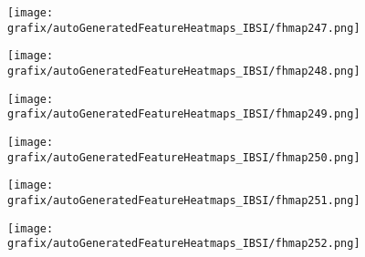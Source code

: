 \hspace{\hsp} 
\begin{subfigure}{\wid\textwidth} 
    \centering 
    \caption{\tiny \sffamily {}} 
    \vspace{\vsp} 
    \texttt{[image: grafix/autoGeneratedFeatureHeatmaps\_IBSI/fhmap247.png]} 
\end{subfigure} 
\hspace{\hsp} 
\begin{subfigure}{\wid\textwidth} 
    \centering 
    \caption{\tiny \sffamily {}} 
    \vspace{\vsp} 
    \texttt{[image: grafix/autoGeneratedFeatureHeatmaps\_IBSI/fhmap248.png]} 
\end{subfigure} 
\hspace{\hsp} 
\begin{subfigure}{\wid\textwidth} 
    \centering 
    \caption{\tiny \sffamily {}} 
    \vspace{\vsp} 
    \texttt{[image: grafix/autoGeneratedFeatureHeatmaps\_IBSI/fhmap249.png]} 
\end{subfigure} 
\hspace{\hsp} 
\begin{subfigure}{\wid\textwidth} 
    \centering 
    \caption{\tiny \sffamily {}} 
    \vspace{\vsp} 
    \texttt{[image: grafix/autoGeneratedFeatureHeatmaps\_IBSI/fhmap250.png]} 
\end{subfigure} 
\hspace{\hsp} 
\begin{subfigure}{\wid\textwidth} 
    \centering 
    \caption{\tiny \sffamily {}} 
    \vspace{\vsp} 
    \texttt{[image: grafix/autoGeneratedFeatureHeatmaps\_IBSI/fhmap251.png]} 
\end{subfigure} 
\hspace{\hsp} 
\begin{subfigure}{\wid\textwidth} 
    \centering 
    \caption{\tiny \sffamily {}} 
    \vspace{\vsp} 
    \texttt{[image: grafix/autoGeneratedFeatureHeatmaps\_IBSI/fhmap252.png]} 
\end{subfigure} 
\hspace{\hsp} 

